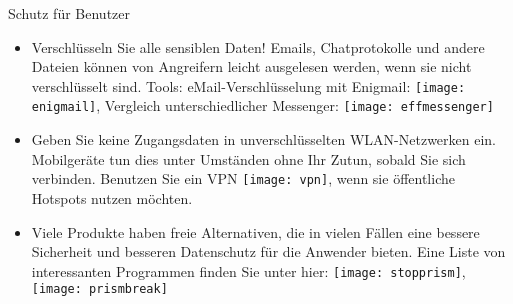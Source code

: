 \documentclass[final]{beamer}
\begin{document}
\begin{frame}[t]
\begin{columns}
\begin{column}{0.95\textwidth}
\begin{alertblock}{Schutz für Benutzer}
{\begin{itemize}
 \item Verschlüsseln Sie alle sensiblen Daten! Emails, Chatprotokolle und andere Dateien können
 von Angreifern leicht ausgelesen werden, wenn sie nicht verschlüsselt sind. 
 Tools: 
 eMail-Verschlüsselung mit Enigmail: \texttt{[image: enigmail]},
 Vergleich unterschiedlicher Messenger: \texttt{[image: effmessenger]}
 
 \item Geben Sie keine Zugangsdaten in unverschlüsselten WLAN-Netzwerken ein. Mobilgeräte tun
 dies unter Umständen ohne Ihr Zutun, sobald Sie sich verbinden. Benutzen Sie ein VPN 
 \texttt{[image: vpn]}, wenn sie öffentliche Hotspots nutzen möchten.
 
 \item Viele Produkte haben freie Alternativen, die in vielen Fällen eine bessere Sicherheit
 und besseren Datenschutz für die Anwender bieten. Eine Liste von interessanten Programmen finden
 Sie unter hier: \texttt{[image: stopprism]}, \texttt{[image: prismbreak]}
\end{itemize}
}
\end{alertblock}

\end{column}

\end{columns}


\end{frame} %
\end{document}
